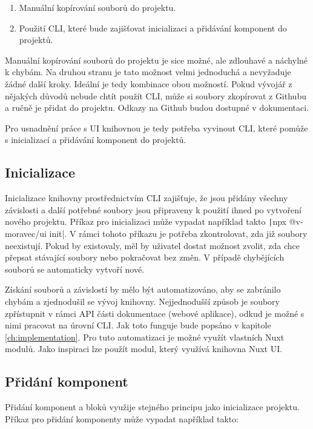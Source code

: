 \begin{enumerate}
  \item Manuální kopírování souborů do projektu.
  \item Použití CLI, které bude zajišťovat inicializaci a přidávání komponent do projektů.
\end{enumerate}

Manuální kopírování souborů do projektu je sice možné, ale zdlouhavé a náchylné k chybám. Na druhou stranu je tato možnost velmi jednoduchá a nevyžaduje žádné další kroky. Ideální je tedy kombinace obou možností.
Pokud vývojář z nějakých důvodů nebude chtít použít CLI, může si soubory zkopírovat z Githubu a ručně je přidat do projektu. Odkazy na Github budou dostupné v dokumentaci.

Pro usnadnění práce s UI knihovnou je tedy potřeba vyvinout CLI, které pomůže s inicializací a přidávání komponent do projektů.

\subsection{Inicializace}
Inicializace knihovny prostřednictvím CLI zajišťuje, že jsou přidány všechny závislosti a další potřebné soubory jsou připraveny k použití ihned po vytvoření nového projektu. Příkaz pro inicializaci může vypadat například takto \texttt|npx @v-moravec/ui init|. V rámci tohoto příkazu je potřeba zkontrolovat, zda již soubory neexistují. Pokud by existovaly, měl by uživatel dostat možnost zvolit, zda chce přepsat stávající soubory nebo pokračovat bez změn. V případě chybějících souborů se automaticky vytvoří nové.

Získání souborů a závislostí by mělo být automatizováno, aby se zabránilo chybám a zjednodušil se vývoj knihovny. Nejjednodušší způsob je soubory zpřístupnit v rámci API části dokumentace (webové aplikace), odkud je možné s nimi pracovat na úrovní CLI. Jak toto funguje bude popsáno v kapitole \ref{ch:implementation}. Pro tuto automatizaci je možné využít vlastních Nuxt modulů. Jako inspiraci lze použít modul, který využívá knihovna Nuxt UI. \cite{NuxtUISourceCodeModule}

\subsection{Přidání komponent}
Přidání komponent a bloků využije stejného principu jako inicializace projektu. Příkaz pro přidání komponenty může vypadat například takto:\\

